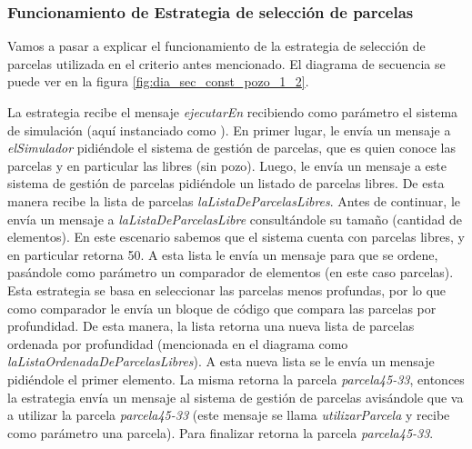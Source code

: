 \subsubsection{Funcionamiento de Estrategia de selección de parcelas}
\label{sec:dia_sec_estr_selec_parc}
\par Vamos a pasar a explicar el funcionamiento de la estrategia de selección de parcelas utilizada en el criterio antes mencionado. El diagrama de secuencia se puede ver en la figura \ref{fig:dia_sec_const_pozo_1_2}.
\par La estrategia recibe el mensaje \textit{ejecutarEn} recibiendo como parámetro el sistema de simulación (aquí instanciado como ). En primer lugar, le envía un mensaje a \textit{elSimulador} pidiéndole el sistema de gestión de parcelas, que es quien conoce las parcelas y en particular las libres (sin pozo). Luego, le envía un mensaje a este sistema de gestión de parcelas pidiéndole un listado de parcelas libres. De esta manera recibe la lista de parcelas \textit{laListaDeParcelasLibres}. Antes de continuar, le envía un mensaje a \textit{laListaDeParcelasLibre} consultándole su tamaño (cantidad de elementos). En este escenario sabemos que el sistema cuenta con parcelas libres, y en particular retorna 50. A esta lista le envía un mensaje para que se ordene, pasándole como parámetro un comparador de elementos (en este caso parcelas). Esta estrategia se basa en seleccionar las parcelas menos profundas, por lo que como comparador le envía un bloque de código que compara las parcelas por profundidad. De esta manera, la lista retorna una nueva lista de parcelas ordenada por profundidad (mencionada en el diagrama como \textit{laListaOrdenadaDeParcelasLibres}). A esta nueva lista se le envía un mensaje pidiéndole el primer elemento. La misma retorna la parcela \textit{parcela45-33}, entonces la estrategia envía un mensaje al sistema de gestión de parcelas avisándole que va a utilizar la parcela \textit{parcela45-33} (este mensaje se llama \textit{utilizarParcela} y recibe como parámetro una parcela). Para finalizar retorna la parcela \textit{parcela45-33}.

